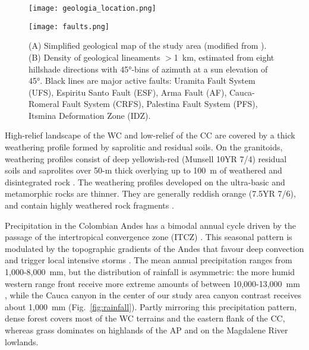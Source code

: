 \documentclass[draft]{agujournal2019}
\begin{document}
\begin{figure}[ht!]
  \begin{minipage}{.48\linewidth}
    \centering
      {\texttt{[image: geologia\_location.png]}}
  \end{minipage}\quad
  \begin{minipage}{.48\linewidth}
    \centering
      {\texttt{[image: faults.png]}}
  \end{minipage}
    \caption{(A) Simplified geological map of the study area (modified from ). (B) Density of geological lineaments $>$1~km, estimated from eight hillshade directions with 45°-bins of azimuth at a sun elevation of 45°. Black lines are major active faults: Uramita Fault System (UFS), Espiritu Santo Fault (ESF), Arma Fault (AF), Cauca-Romeral Fault System (CRFS), Palestina Fault System (PFS), Itsmina Deformation Zone (IDZ).}
    \label{fig:geologia}
\end{figure}

\par High-relief landscape of the WC and low-relief of the CC are covered by a thick weathering profile formed by saprolitic and residual soils. On the granitoids, weathering profiles consist of deep yellowish-red (Munsell 10YR 7/4) residual soils and saprolites over 50-m thick overlying up to 100~m of weathered and disintegrated rock \cite{aristizabal2005tropical}. The weathering profiles developed on the ultra-basic and metamorphic rocks are thinner. They are generally reddish orange (7.5YR 7/6), and contain highly weathered rock fragments \cite{aristizabal2005tropical}.

\par Precipitation in the Colombian Andes has a bimodal annual cycle driven by the passage of the intertropical convergence zone (ITCZ) \cite{bedoya2019}. This seasonal pattern is modulated by the topographic gradients of the Andes that favour deep convection and trigger local intensive storms \cite{Poveda2011}. The mean annual precipitation ranges from 1,000-8,000~mm, but the distribution of rainfall is asymmetric: the more humid western range front receive more extreme amounts of between 10,000-13,000~mm \cite{poveda2000existence}, while the Cauca canyon in the center of our study area canyon contrast receives about 1,000~mm (Fig.~\ref{fig:rainfall}). Partly mirroring this precipitation pattern, dense forest covers most of the WC terrains and the eastern flank of the CC, whereas grass dominates on highlands of the AP and on the Magdalene River lowlands.
\end{document}
